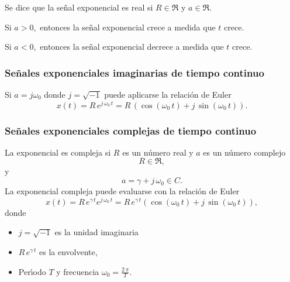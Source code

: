 Se dice que la se\~{n}al exponencial es real si $R\in \Re$ y $a\in \Re$.

Si $ a > 0,$ entonces la se\~{n}al exponencial crece a medida que $t$ crece.

Si $ a < 0,$ entonces la se\~{n}al exponencial decrece a medida que $t$ crece.

\subsubsection{Se\~{n}ales exponenciales imaginarias de tiempo continuo}

Si $a = j \omega_{0}$ donde $j=\sqrt{-1}$ puede aplicarse la
relaci\'{o}n de Euler
\begin{equation}
  x\left( t\right) = 
  R \, e^{j \, \omega_{0} \, t}= 
  R \, \left(\cos \left( \omega_{0} \, t\right) +j \, \sin\left( \omega_{0} \, t\right) \right).
\end{equation}

\subsubsection{Se\~{n}ales exponenciales complejas de tiempo continuo}

La exponencial es compleja si $R$ es un n\'{u}mero real y $a$ es un n\'{u}mero complejo
\begin{equation}
  R\in \Re,
\end{equation}
y
\begin{equation}
  a=\gamma+j \, \omega_{0}\in C.
\end{equation}
La exponencial compleja puede evaluarse con la relaci\'{o}n de Euler
\begin{equation}
  x(t)= R \, e^{\gamma \, t}e^{j \, \omega_{0} \, t} = 
  R \, e^{\gamma \, t}\left( \cos \left( \omega_{0} \, t\right) + j \, \sin \left( \omega_{0} \, t\right) \right) ,
\end{equation}
donde
\begin{itemize}
\item $j=\sqrt{-1}$ es la unidad imaginaria
\item $R \, e^{\gamma \, t}$ es la envolvente,
\item Per\'{\i}odo $T$ y frecuencia $\omega_{0} = \frac{2 \, \pi}{T}$.
\end{itemize}

